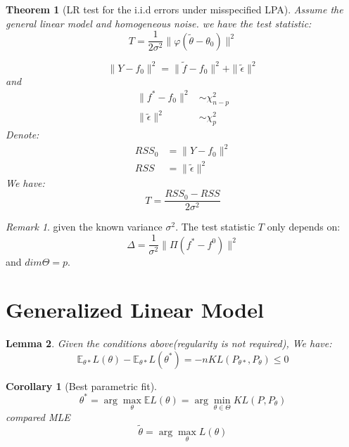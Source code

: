 \documentclass[a4paper,12pt, oneside, fleqn]{book}
\newtheorem{theorem}{Theorem}[section]
\newtheorem{corollary}{Corollary}[theorem]
\newtheorem{lemma}[theorem]{Lemma}
\theoremstyle{definition}
\theoremstyle{remark}
\newtheorem*{remark}{Remark}
\begin{document}
\begin{theorem}[LR test for the i.i.d errors under misspecified LPA]
	Assume the general linear model and homogeneous noise. we have the test statistic:
	\begin{equation*}
		T = \frac{1}{2\sigma^2} \|\varphi(\tilde{\theta} - \theta_0)\|^2
	\end{equation*}
	
	\begin{equation*}
		\|Y - f_0\|^2 = \|\tilde{f} - f_0 \|^2 + \|\tilde{\epsilon}\|^2
	\end{equation*}
	and 
	\begin{align*}
		\|f^* - f_0 \|^2 &\sim \chi_{n - p}^2\\
		\|\tilde{\epsilon}\|^2 &\sim \chi_p^2
	\end{align*}
	Denote:
	\begin{align*}
		RSS_0 &= \|Y - f_0\|^2\\
		RSS &= \|\tilde{\epsilon}\|^2
	\end{align*}
	We have:\begin{equation*}
		T = \frac{RSS_0 - RSS}{2\sigma^2}
	\end{equation*}
\end{theorem}

\begin{remark}
given the known variance $\sigma^2$. The test statistic $T$ only depends on:
\begin{equation*}
	\Delta = \frac{1}{\sigma^2} \|\Pi(f^* - f^0)\|^2
\end{equation*}	
and $dim \Theta = p$.
\end{remark}





\newpage


\section{Generalized Linear Model}
\begin{lemma}
	Given the conditions above(regularity is not required), We have:
	\begin{equation*}
	\mathbb{E}_{\theta*} L(\theta) - \mathbb{E}_{\theta*} L(\theta^*) = -n KL(P_{\theta*}, P_{\theta}) \leq 0		
	\end{equation*}

\end{lemma}

\begin{corollary}[Best parametric fit]
	\begin{equation}\label{est:BPF}
		\theta^* = \arg \max_{\theta} \mathbb{E} L(\theta) = \arg \min_{\theta \in \Theta} KL(P, P_\theta)
	\end{equation}
	compared MLE
	\begin{equation} \label{est: MLE}
		\tilde{\theta} = \arg \max_\theta L(\theta)
	\end{equation}
\end{corollary}
\end{document}
